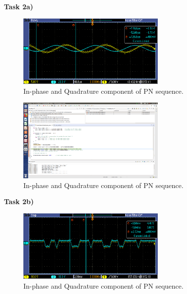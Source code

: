 \documentclass{article}
\begin{document}
\pagebreak
\textbf{Task 2a)}

\begin{figure}[h]
  \begin{center}
    \includegraphics[width=0.65\textwidth]{img/task_2_b_oscilloscope.png}
    \caption{In-phase and Quadrature component of PN sequence.}
  \end{center}
\end{figure}

\begin{figure}[h]
  \begin{center}
    \includegraphics[width=0.65\textwidth]{img/task_2_b_profile.png}
    \caption{In-phase and Quadrature component of PN sequence.}
  \end{center}
\end{figure}

\pagebreak
\textbf{Task 2b)}

\begin{figure}[h]
  \begin{center}
    \includegraphics[width=0.65\textwidth]{img/task_2_c_oscilloscope.png}
    \caption{In-phase and Quadrature component of PN sequence.}
  \end{center}
\end{figure}
\end{document}

